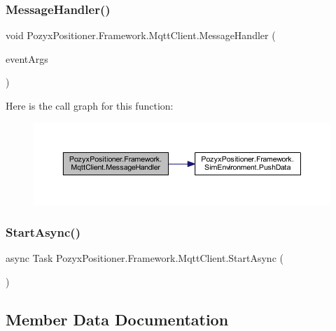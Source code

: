 \subsubsection{\texorpdfstring{Message\+Handler()}{MessageHandler()}}
{\footnotesize\ttfamily void Pozyx\+Positioner.\+Framework.\+Mqtt\+Client.\+Message\+Handler (\begin{DoxyParamCaption}\item[{Mqtt\+Application\+Message\+Received\+Event\+Args}]{event\+Args }\end{DoxyParamCaption})}

Here is the call graph for this function\+:
\nopagebreak
\begin{figure}[H]
\begin{center}
\leavevmode
\includegraphics[width=350pt]{class_pozyx_positioner_1_1_framework_1_1_mqtt_client_a1fda7c69a63eeeb876490644686b103f_cgraph}
\end{center}
\end{figure}
\mbox{\label{class_pozyx_positioner_1_1_framework_1_1_mqtt_client_a92ccb3ea4e84923cfb26c02367fac49e}} 
\subsubsection{\texorpdfstring{Start\+Async()}{StartAsync()}}
{\footnotesize\ttfamily async Task Pozyx\+Positioner.\+Framework.\+Mqtt\+Client.\+Start\+Async (\begin{DoxyParamCaption}{ }\end{DoxyParamCaption})}



\subsection{Member Data Documentation}
\mbox{\label{class_pozyx_positioner_1_1_framework_1_1_mqtt_client_affc988c8046e844a8814a33dcc7ae611}} 
